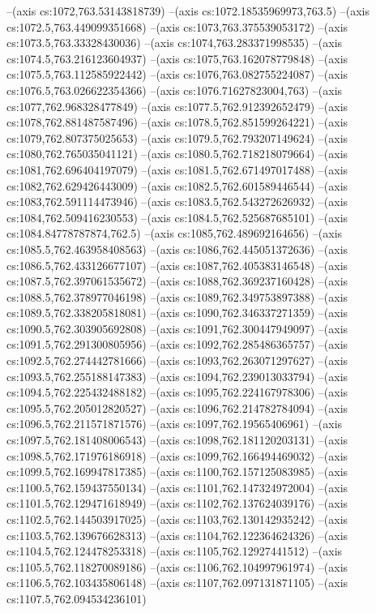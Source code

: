 --(axis cs:1072,763.53143818739)
--(axis cs:1072.18535969973,763.5)
--(axis cs:1072.5,763.449099351668)
--(axis cs:1073,763.375539053172)
--(axis cs:1073.5,763.33328430036)
--(axis cs:1074,763.283371998535)
--(axis cs:1074.5,763.216123604937)
--(axis cs:1075,763.162078779848)
--(axis cs:1075.5,763.112585922442)
--(axis cs:1076,763.082755224087)
--(axis cs:1076.5,763.026622354366)
--(axis cs:1076.71627823004,763)
--(axis cs:1077,762.968328477849)
--(axis cs:1077.5,762.912392652479)
--(axis cs:1078,762.881487587496)
--(axis cs:1078.5,762.851599264221)
--(axis cs:1079,762.807375025653)
--(axis cs:1079.5,762.793207149624)
--(axis cs:1080,762.765035041121)
--(axis cs:1080.5,762.718218079664)
--(axis cs:1081,762.696404197079)
--(axis cs:1081.5,762.671497017488)
--(axis cs:1082,762.629426443009)
--(axis cs:1082.5,762.601589446544)
--(axis cs:1083,762.591114473946)
--(axis cs:1083.5,762.543272626932)
--(axis cs:1084,762.509416230553)
--(axis cs:1084.5,762.525687685101)
--(axis cs:1084.84778787874,762.5)
--(axis cs:1085,762.489692164656)
--(axis cs:1085.5,762.463958408563)
--(axis cs:1086,762.445051372636)
--(axis cs:1086.5,762.433126677107)
--(axis cs:1087,762.405383146548)
--(axis cs:1087.5,762.397061535672)
--(axis cs:1088,762.369237160428)
--(axis cs:1088.5,762.378977046198)
--(axis cs:1089,762.349753897388)
--(axis cs:1089.5,762.338205818081)
--(axis cs:1090,762.346337271359)
--(axis cs:1090.5,762.303905692808)
--(axis cs:1091,762.300447949097)
--(axis cs:1091.5,762.291300805956)
--(axis cs:1092,762.285486365757)
--(axis cs:1092.5,762.274442781666)
--(axis cs:1093,762.263071297627)
--(axis cs:1093.5,762.255188147383)
--(axis cs:1094,762.239013033794)
--(axis cs:1094.5,762.225432488182)
--(axis cs:1095,762.224167978306)
--(axis cs:1095.5,762.205012820527)
--(axis cs:1096,762.214782784094)
--(axis cs:1096.5,762.211571871576)
--(axis cs:1097,762.19565406961)
--(axis cs:1097.5,762.181408006543)
--(axis cs:1098,762.181120203131)
--(axis cs:1098.5,762.171976186918)
--(axis cs:1099,762.166494469032)
--(axis cs:1099.5,762.169947817385)
--(axis cs:1100,762.157125083985)
--(axis cs:1100.5,762.159437550134)
--(axis cs:1101,762.147324972004)
--(axis cs:1101.5,762.129471618949)
--(axis cs:1102,762.137624039176)
--(axis cs:1102.5,762.144503917025)
--(axis cs:1103,762.130142935242)
--(axis cs:1103.5,762.139676628313)
--(axis cs:1104,762.122364624326)
--(axis cs:1104.5,762.124478253318)
--(axis cs:1105,762.12927441512)
--(axis cs:1105.5,762.118270089186)
--(axis cs:1106,762.104997961974)
--(axis cs:1106.5,762.103435806148)
--(axis cs:1107,762.097131871105)
--(axis cs:1107.5,762.094534236101)
